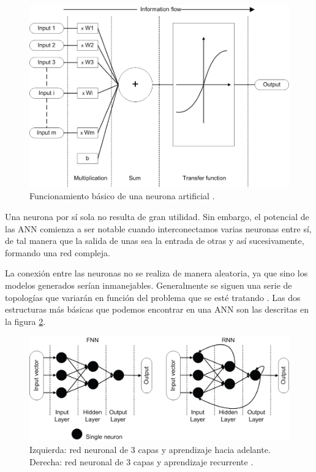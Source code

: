 \begin{figure}[h]
    \centering
    \includegraphics[width=1\textwidth]{img/neurona.png}
    \caption{Funcionamiento básico de una neurona artificial \cite{ann:intro}.}
    \label{fig:neurona}
\end{figure}

Una neurona por sí sola no resulta de gran utilidad. Sin embargo, el potencial de las ANN comienza a ser notable cuando interconectamos varias neuronas entre sí, de tal manera que la salida de unas sea la entrada de otras y así sucesivamente, formando una red compleja.

La conexión entre las neuronas no se realiza de manera aleatoria, ya que sino los modelos generados serían inmanejables. Generalmente se siguen una serie de topologías que variarán en función del problema que se esté tratando \cite{ann:intro, cnn:ieee}. Las dos estructuras más básicas que podemos encontrar en una ANN son las descritas en la figura \ref{fig:red_neuronal}.

\begin{figure}[h]
    \centering
    \includegraphics[width=1\textwidth]{img/red_neuronal.png}
    \caption{Izquierda: red neuronal de 3 capas y aprendizaje hacia adelante. Derecha: red neuronal de 3 capas y aprendizaje recurrente  \cite{ann:intro}.}
    \label{fig:red_neuronal}
\end{figure}

